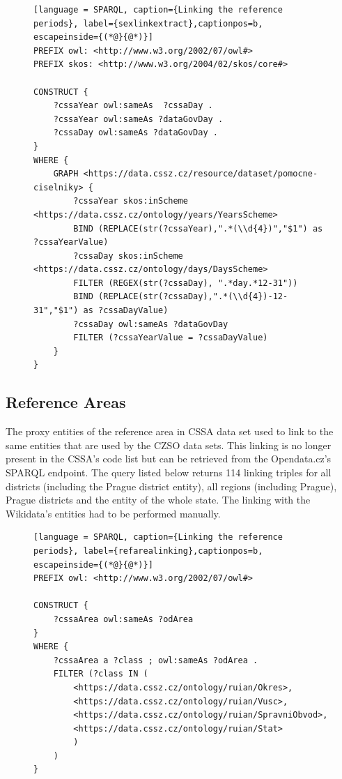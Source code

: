 \begin{figure}[h]
\begin{lstlisting}[language = SPARQL, caption={Linking the reference periods}, label={sexlinkextract},captionpos=b, escapeinside={(*@}{@*)}]
PREFIX owl: <http://www.w3.org/2002/07/owl#>
PREFIX skos: <http://www.w3.org/2004/02/skos/core#>
    
CONSTRUCT {
    ?cssaYear owl:sameAs  ?cssaDay .
    ?cssaYear owl:sameAs ?dataGovDay .
    ?cssaDay owl:sameAs ?dataGovDay .
}  
WHERE {
    GRAPH <https://data.cssz.cz/resource/dataset/pomocne-ciselniky> {
        ?cssaYear skos:inScheme <https://data.cssz.cz/ontology/years/YearsScheme>
        BIND (REPLACE(str(?cssaYear),".*(\\d{4})","$1") as ?cssaYearValue)
        ?cssaDay skos:inScheme <https://data.cssz.cz/ontology/days/DaysScheme>
        FILTER (REGEX(str(?cssaDay), ".*day.*12-31"))
        BIND (REPLACE(str(?cssaDay),".*(\\d{4})-12-31","$1") as ?cssaDayValue)
        ?cssaDay owl:sameAs ?dataGovDay
        FILTER (?cssaYearValue = ?cssaDayValue)
    }
}
\end{lstlisting}
\end{figure}

\subsection{Reference Areas}

The proxy entities of the reference area in CSSA data set used to link to the same entities that are used by the CZSO data sets. This linking is no longer present in the CSSA's code list but can be retrieved from the Opendata.cz's SPARQL endpoint. The query listed below returns 114 linking triples for all districts (including the Prague district entity), all regions (including Prague), Prague districts and the entity of the whole state. The linking with the Wikidata's entities had to be performed manually.

\begin{figure}[h]
\begin{lstlisting}[language = SPARQL, caption={Linking the reference periods}, label={refarealinking},captionpos=b, escapeinside={(*@}{@*)}]
PREFIX owl: <http://www.w3.org/2002/07/owl#>

CONSTRUCT {
    ?cssaArea owl:sameAs ?odArea
}
WHERE {
    ?cssaArea a ?class ; owl:sameAs ?odArea .
    FILTER (?class IN (
        <https://data.cssz.cz/ontology/ruian/Okres>,
        <https://data.cssz.cz/ontology/ruian/Vusc>,
        <https://data.cssz.cz/ontology/ruian/SpravniObvod>,
        <https://data.cssz.cz/ontology/ruian/Stat>
        )
    )
}
\end{lstlisting}
\end{figure}

